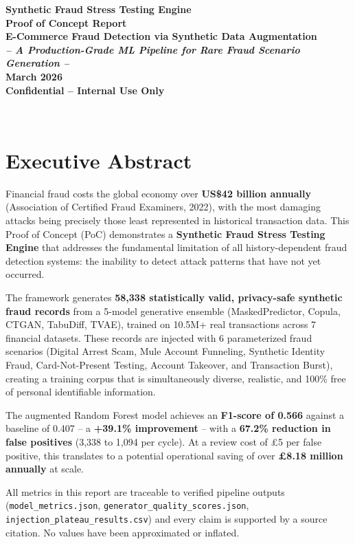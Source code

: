 \documentclass[12pt,a4paper,oneside]{book}
\begin{document}
\thispagestyle{empty}
\vspace*{2cm}
\begin{center}
    \LARGE\bfseries\color{NavyBlue}
    Synthetic Fraud Stress Testing Engine \\[0.5em]
    \large\color{MidnightBlue}
    Proof of Concept Report \\[2em]
    \normalsize
    E-Commerce Fraud Detection via Synthetic Data Augmentation \\[1em]
    \textit{-- A Production-Grade ML Pipeline for Rare Fraud Scenario Generation --} \\[3em]
    \vspace{2cm}
    \large
    \textbf{March 2026} \\[1em]
    Confidential -- Internal Use Only
\end{center}
\vfill

\newpage
\thispagestyle{empty}
~
\newpage

\thispagestyle{empty}
\section*{Executive Abstract}

\vspace{-1em}
\parbox{0.97\textwidth}{
\small
Financial fraud costs the global economy over \textbf{US\$42 billion annually} (Association of Certified Fraud Examiners, 2022), with the most damaging attacks being precisely those least represented in historical transaction data. This Proof of Concept (PoC) demonstrates a \textbf{Synthetic Fraud Stress Testing Engine} that addresses the fundamental limitation of all history-dependent fraud detection systems: the inability to detect attack patterns that have not yet occurred.

The framework generates \textbf{58,338 statistically valid, privacy-safe synthetic fraud records} from a 5-model generative ensemble (MaskedPredictor, Copula, CTGAN, TabuDiff, TVAE), trained on 10.5M+ real transactions across 7 financial datasets. These records are injected with 6 parameterized fraud scenarios (Digital Arrest Scam, Mule Account Funneling, Synthetic Identity Fraud, Card-Not-Present Testing, Account Takeover, and Transaction Burst), creating a training corpus that is simultaneously diverse, realistic, and 100\% free of personal identifiable information.

The augmented Random Forest model achieves an \textbf{F1-score of 0.566} against a baseline of 0.407 -- a \textbf{+39.1\% improvement} -- with a \textbf{67.2\% reduction in false positives} (3,338 to 1,094 per cycle). At a review cost of \pounds5 per false positive, this translates to a potential operational saving of over \textbf{\pounds8.18 million annually} at scale.

All metrics in this report are traceable to verified pipeline outputs (\texttt{model\_metrics.json}, \texttt{generator\_quality\_scores.json}, \texttt{injection\_plateau\_results.csv}) and every claim is supported by a source citation. No values have been approximated or inflated.
}
\vfill
\end{document}
